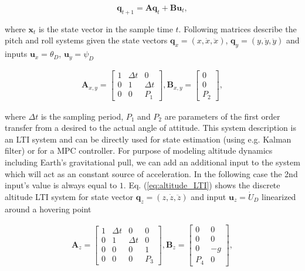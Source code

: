 \begin{equation}
\mathbf{q}_{t+1} = \mathbf{A}\mathbf{q}_{t}+ \mathbf{B}\mathbf{u}_{t},
\end{equation}

where $\mathbf{x}_{t}$ is the state vector in the sample time $t$. Following matrices describe the pitch and roll systems given the state vectors $\mathbf{q}_{x} = \left(x, \dot{x}, \ddot{x}\right)$, $\mathbf{q}_{y} = \left(y, \dot{y}, \ddot{y}\right)$ and inputs $\mathbf{u}_x = \theta_D$, $\mathbf{u}_y = \psi_D$

\begin{equation}
\begin{split}
\mathbf{A}_{x, y} = \begin{bmatrix}
1 & \Delta t & 0 \\
0 & 1 & \Delta t \\
0 & 0 & P_1
\end{bmatrix}, \mathbf{B}_{x, y} = \begin{bmatrix}
0\\
0\\
P_2
\end{bmatrix},
\end{split}
\end{equation}

where $\Delta t$ is the sampling period, $P_1$ and $P_2$ are parameters of the first order transfer from a desired to the actual angle of attitude. This system description is an LTI system and can be directly used for state estimation (using e.g. Kalman filter) or for a MPC controller. For purpose of modeling altitude dynamics including Earth's gravitational pull, we can add an additional input to the system which will act as an constant source of acceleration. In the following case the 2nd input's value is always equal to $1$. Eq. (\ref{eq:altitude_LTI}) shows the discrete altitude LTI system for state vector $\mathbf{q}_{z} = \left(z, \dot{z}, \ddot{z}\right)$ and input $\mathbf{u}_z = \dot{U}_D$ linearized around a hovering point

\begin{equation}
\begin{split}
\mathbf{A}_{z} = \begin{bmatrix}
1 & \Delta t & 0 & 0\\
0 & 1 & \Delta t & 0\\
0 & 0 & 0 & 1 \\
0 & 0 & 0 & P_3
\end{bmatrix}, \mathbf{B}_{z} = \begin{bmatrix}
0 & 0\\
0 & 0\\
0 & -g\\
P_4 & 0
\end{bmatrix},
\end{split}
\label{eq:altitude_LTI}
\end{equation}

